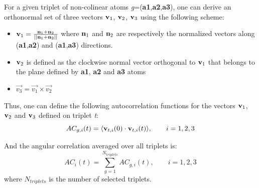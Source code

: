 \documentclass[a4paper,11pt]{report}
\begin{document}
For a given triplet of non-colinear atoms \textit{g}=(\textbf{a1},\textbf{a2},\textbf{a3}), one can derive an orthonormal 
set of three vectors ${\bf v}_1$, ${\bf v}_2$, ${\bf v}_3$ using the following scheme:

\begin{itemize}
\item ${\bf v}_1 = \frac{{\bf n}_{1} + {\bf n}_{2}}{||{\bf n}_{1} + {\bf n}_{2}||}$
where ${\bf n}_{1}$ and ${\bf n}_{2}$ are respectively the normalized vectors along (\textbf{a1},\textbf{a2}) 
and (\textbf{a1},\textbf{a3}) directions.
\item ${\bf v}_2$ is defined as the clockwise normal vector orthogonal to ${\bf v}_1$ that belongs to the plane 
defined by \textbf{a1}, \textbf{a2} and \textbf{a3} atoms
\item $\vec{v_3} = \vec{v_1} \times \vec{v_2}$
\end{itemize}

Thus, one can define the following autocorrelation functions for the vectors ${\bf v}_1$, ${\bf v}_2$ and ${\bf v}_3$ 
defined on triplet \textit{t}:
\begin{equation}
\label{eq:ac_per_triplet}
AC_{g,i} (t) = \langle {\bf v}_{t,i}(0)\cdot{\bf v}_{t,i}(t)\rangle, \qquad  i = 1,2,3
\end{equation}

And the angular correlation averaged over all triplets is:
\begin{equation}
\label{eq:ac}
AC_i(t) = \sum_{g=1}^{N_{triplets}} AC_{g,i}(t), \qquad  i = 1,2,3
\end{equation}
where $N_{triplets}$ is the number of selected triplets.
\end{document}
